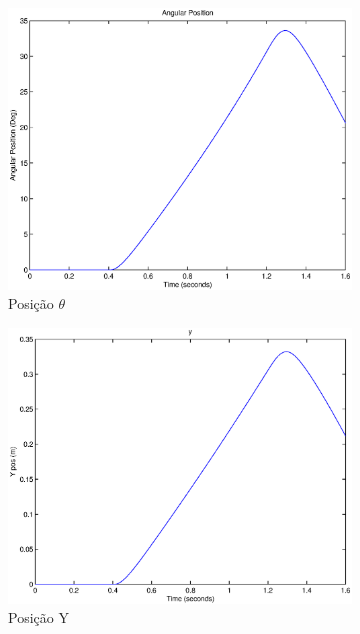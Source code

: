 \documentclass{article}
\begin{document}
\begin{figure}[H]
	\centering
	\begin{subfigure}{0.45\textwidth}
		\includegraphics[width=\linewidth]{matlab/theta7}
		\caption{Posição $\theta$}
	\end{subfigure}
	\begin{subfigure}{0.45\textwidth}
		\includegraphics[width=\linewidth]{matlab/y7}
		\caption{Posição Y}
	\end{subfigure}
	\begin{subfigure}{0.45\textwidth}

\end{subfigure}
\end{figure}
\end{document}
